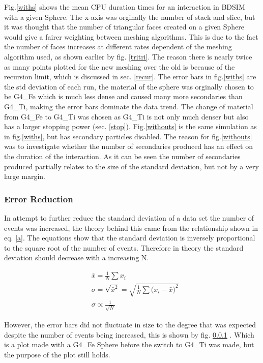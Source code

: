 \documentclass[12pt,a4paper]{article}
\begin{document}
\noindent Fig.\ref{withs} shows the mean CPU duration times for an interaction in BDSIM with a given Sphere. The x-axis was orginally the number of stack and slice, but it was thought that the number of triangular faces created on a given Sphere would give a fairer weighting between meshing algorithms. This is due to the fact the number of faces increases at different rates dependent of the meshing algorithm used, as shown earlier by fig. \ref{tritri}. The reason there is nearly twice as many points plotted for the new meshing over the old is because of the recursion limit, which is discussed in sec. \ref{recur}. The error bars in fig.\ref{withs} are the std deviation of each run, the material of the sphere was orginally chosen to be G4\_Fe which is much less dense and caused many more secondaries than G4\_Ti, making the error bars dominate the data trend. The change of material from G4\_Fe to G4\_Ti was chosen as G4\_Ti is not only much denser but also has a larger stopping power (sec. \ref{stop}). Fig.\ref{withouts} is the same simulation as in fig.\ref{withs}, but has secondary particles disabled. The reason for fig.\ref{withouts} was to investigate whether the number of secondaries produced has an effect on the duration of the interaction. As it can be seen the number of secondaries produced partially relates to the size of the standard deviation, but not by a very large margin.

\newpage
\subsubsection{Error Reduction}
\label{err}
\noindent In attempt to further reduce the standard deviation of a data set the number of events was increased, the theory behind this came from the relationship shown in eq. \ref{a}. The equations show that the standard deviation is inversely proportional to the square root of the number of events. Therefore in theory the standard deviation should decrease with a increasing N.

\begin{equation}
\begin{aligned}
& \bar{x} = \frac{1}{N}\sum{x_i}\\
& \sigma = \sqrt{\bar{x}^2} = \sqrt{\frac{1}{N}\sum{(x_i - \bar{x}})^2}\\
& \sigma \propto \frac{1}{\sqrt{N}} 
\end{aligned}
\label{a}
\end{equation}

\noindent However, the error bars did not fluctuate in size to the degree that was expected despite the number of events being increased, this is shown by fig. \ref{err} . Which is a plot made with a G4\_Fe Sphere before the switch to G4\_Ti was made, but the purpose of the plot still holds. 
\end{document}
